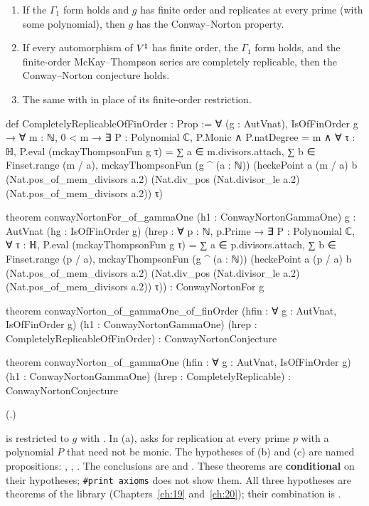 \begin{theorem}\label{ch16:thm:bridge}
\begin{enumerate}[label=(\alph*)]
\item If the $\Gamma_1$ form holds and $g$ has finite order and replicates at every prime (with some polynomial), then
  $g$ has the Conway--Norton property.
\item If every automorphism of ${V^{\natural}}$ has finite order, the $\Gamma_1$ form holds, and the finite-order McKay--Thompson
  series are completely replicable, then the Conway--Norton conjecture holds.
\item The same with  in place of its finite-order restriction.
\end{enumerate}
\end{theorem}
\begin{leancode}
def CompletelyReplicableOfFinOrder : Prop :=
  ∀ (g : AutVnat), IsOfFinOrder g → ∀ m : ℕ, 0 < m → ∃ P : Polynomial ℂ, P.Monic ∧
    P.natDegree = m ∧ ∀ τ : ℍ, P.eval (mckayThompsonFun g τ) =
      ∑ a ∈ m.divisors.attach, ∑ b ∈ Finset.range (m / a),
        mckayThompsonFun (g ^ (a : ℕ)) (heckePoint a (m / a) b (Nat.pos_of_mem_divisors a.2)
          (Nat.div_pos (Nat.divisor_le a.2) (Nat.pos_of_mem_divisors a.2)) τ)

theorem conwayNortonFor_of_gammaOne (h1 : ConwayNortonGammaOne) {g : AutVnat}
    (hg : IsOfFinOrder g)
    (hrep : ∀ p : ℕ, p.Prime → ∃ P : Polynomial ℂ, ∀ τ : ℍ, P.eval (mckayThompsonFun g τ) =
      ∑ a ∈ p.divisors.attach, ∑ b ∈ Finset.range (p / a),
        mckayThompsonFun (g ^ (a : ℕ)) (heckePoint a (p / a) b (Nat.pos_of_mem_divisors a.2)
          (Nat.div_pos (Nat.divisor_le a.2) (Nat.pos_of_mem_divisors a.2)) τ)) :
    ConwayNortonFor g

theorem conwayNorton_of_gammaOne_of_finOrder (hfin : ∀ g : AutVnat, IsOfFinOrder g)
    (h1 : ConwayNortonGammaOne) (hrep : CompletelyReplicableOfFinOrder) :
    ConwayNortonConjecture

theorem conwayNorton_of_gammaOne (hfin : ∀ g : AutVnat, IsOfFinOrder g)
    (h1 : ConwayNortonGammaOne) (hrep : CompletelyReplicable) : ConwayNortonConjecture
\end{leancode}
(.)
\begin{dictionary}
 is  restricted to $g$ with .
In (a),  asks for replication at every prime $p$ with a polynomial $P$ that need not be monic.  The
hypotheses of (b) and (c) are named propositions: , ,
.  The conclusions are  and .  These theorems are
\textbf{conditional} on their hypotheses; \texttt{\#print axioms} does not show them.  All three hypotheses are
theorems of the library (Chapters~\ref{ch:19} and~\ref{ch:20}); their combination is .
\end{dictionary}

